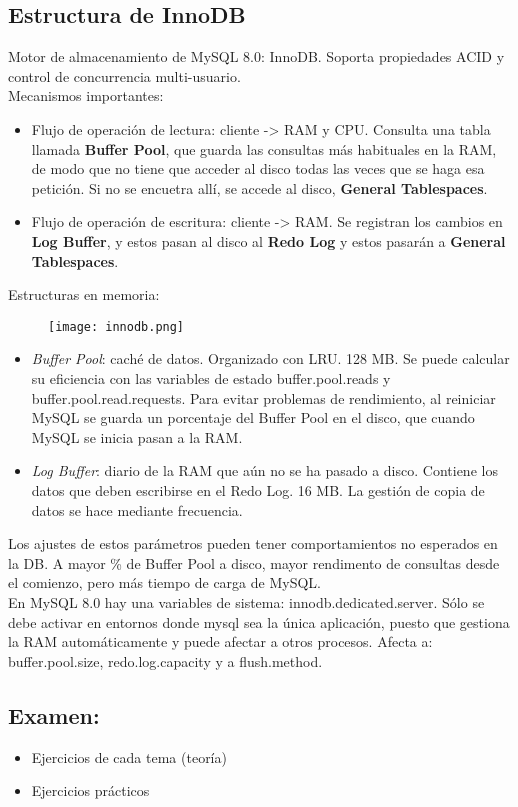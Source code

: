 \documentclass{article}
\begin{document}
\subsection{Estructura de InnoDB}
Motor de almacenamiento de MySQL 8.0: InnoDB. Soporta propiedades ACID y control de concurrencia multi-usuario.\\
Mecanismos importantes:
\begin{itemize}
	\item Flujo de operación de lectura: cliente -> RAM y CPU. Consulta una tabla llamada \textbf{Buffer Pool}, que guarda las consultas más habituales en la RAM, de modo que no tiene que acceder al disco todas las veces que se haga esa petición. Si no se encuetra allí, se accede al disco, \textbf{General Tablespaces}.
	\item Flujo de operación de escritura: cliente -> RAM. Se registran los cambios en \textbf{Log Buffer}, y estos pasan al disco al \textbf{Redo Log} y estos pasarán a \textbf{General Tablespaces}.
\end{itemize}

Estructuras en memoria:
\begin{figure}[h]
\centering
\texttt{[image: innodb.png]}
\end{figure} 
\begin{itemize}
	\item \emph{Buffer Pool}: caché de datos. Organizado con LRU. 128 MB. Se puede calcular su eficiencia con las variables de estado buffer.pool.reads y buffer.pool.read.requests. Para evitar problemas de rendimiento, al reiniciar MySQL se guarda un porcentaje del Buffer Pool en el disco, que cuando MySQL se inicia pasan a la RAM. 
	\item \emph{Log Buffer}: diario de la RAM que aún no se ha pasado a disco. Contiene los datos que deben escribirse en el Redo Log. 16 MB. La gestión de copia de datos se hace mediante frecuencia.  
\end{itemize}
Los ajustes de estos parámetros pueden tener comportamientos no esperados en la DB. A mayor \% de Buffer Pool a disco, mayor rendimento de consultas desde el comienzo, pero más tiempo de carga de MySQL. \\
En MySQL 8.0 hay una variables de sistema: innodb.dedicated.server. Sólo se debe activar en entornos donde mysql sea la única aplicación, puesto que gestiona la RAM automáticamente y puede afectar a otros procesos. Afecta a: buffer.pool.size, redo.log.capacity y a flush.method. 
\subsection{Examen:}
\begin{itemize}
	\item Ejercicios de cada tema (teoría)
	\item Ejercicios prácticos
\end{itemize}
\end{document}
